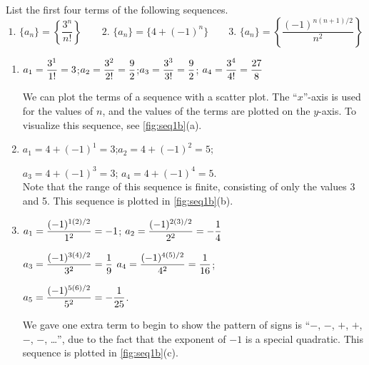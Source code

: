 \begin{example}\label{ex_seq1}%
List the first four terms of the following sequences.
\[
 \text{1. }\{a_n\} = \left\{\frac{3^n}{n!}\right\}\qquad
 \text{2. }\{a_n\} = \{4+(-1)^n\}\qquad
 \text{3. }\{a_n\} = \left\{\frac{(-1)^{n(n+1)/2}}{n^2}\right\}
\]
\solution
\begin{enumerate}
\item		$\displaystyle a_1=\frac{3^1}{1!} = 3$;\qquad	$\displaystyle a_2= \frac{3^2}{2!} = \frac92$;\qquad $\displaystyle a_3 = \frac{3^3}{3!} = \frac92$; \qquad $\displaystyle a_4 = \frac{3^4}{4!} = \frac{27}8$

We can plot the terms of a sequence with a scatter plot. The ``$x$''-axis is used for the values of $n$, and the values of the terms are plotted on the $y$-axis. To visualize this sequence, see \autoref{fig:seq1b}(a).

\item		$a_1= 4+(-1)^1 = 3$;\qquad $a_2 = 4+(-1)^2 = 5$; 

\noindent $a_3=4+(-1)^3 = 3$; \qquad $a_4 = 4+(-1)^4 = 5$.\\
Note that the range of this sequence is finite, consisting of only the values 3 and 5. This sequence is plotted in \autoref{fig:seq1b}(b).

\item		$\displaystyle a_1= \frac{(-1)^{1(2)/2}}{1^2} = -1$; \qquad $\displaystyle a_2 = \frac{(-1)^{2(3)/2}}{2^2} =-\frac14$

\noindent $\displaystyle a_3 = \frac{(-1)^{3(4)/2}}{3^2} = \frac19$ \qquad $\displaystyle a_4 = \frac{(-1)^{4(5)/2}}{4^2} = \frac1{16}$; 

\noindent $\displaystyle a_5 = \frac{(-1)^{5(6)/2}}{5^2}=-\frac1{25}$.

\noindent We gave one extra term to begin to show the pattern of signs is ``$-$, $-$, $+$, $+$, $-$, $-$, \dots'', due to the fact that the exponent of $-1$ is a special quadratic. This sequence is plotted in \autoref{fig:seq1b}(c).
\end{enumerate}
\end{example}

